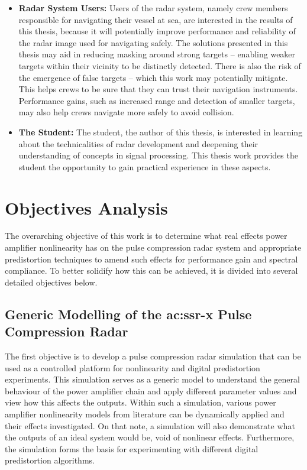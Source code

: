 \begin{itemize}
    \item \textbf{Radar System Users:} Users of the radar system, namely crew members responsible for navigating their vessel at sea, are interested in the results of this thesis, because it will potentially improve performance and reliability of the radar image used for navigating safely. The solutions presented in this thesis may aid in reducing masking around strong targets – enabling weaker targets within their vicinity to be distinctly detected. There is also the risk of the emergence of false targets – which this work may potentially mitigate. This helps crews to be sure that they can trust their navigation instruments. Performance gains, such as increased range and detection of smaller targets, may also help crews navigate more safely to avoid collision.
    \item \textbf{The Student:} The student, the author of this thesis, is interested in learning about the technicalities of radar development and deepening their understanding of concepts in signal processing. This thesis work provides the student the opportunity to gain practical experience in these aspects.
\end{itemize}

\section{Objectives Analysis}\label{sec:objectives_analysis}

The overarching objective of this work is to determine what real effects power amplifier nonlinearity has on the pulse compression radar system and appropriate predistortion techniques to amend such effects for performance gain and spectral compliance. To better solidify how this can be achieved, it is divided into several detailed objectives below.

\subsection{Generic Modelling of the \gls{ac:ssr-x} Pulse Compression Radar}

The first objective is to develop a pulse compression radar simulation that can be used as a controlled platform for nonlinearity and digital predistortion experiments. This simulation serves as a generic model to understand the general behaviour of the power amplifier chain and apply different parameter values and view how this affects the outputs. Within such a simulation, various power amplifier nonlinearity models from literature can be dynamically applied and their effects investigated. On that note, a simulation will also demonstrate what the outputs of an ideal system would be, void of nonlinear effects. Furthermore, the simulation forms the basis for experimenting with different digital predistortion algorithms. 

